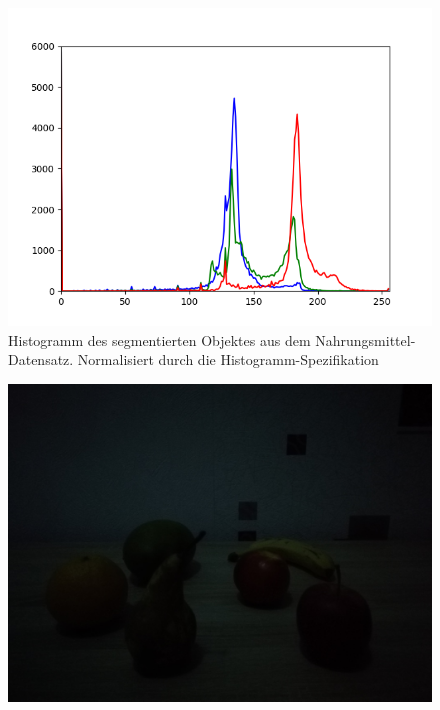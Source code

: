 \begin{appendices}
\begin{figure}[htb]
\begin{minipage}[c]{0.08\textwidth}
\end{minipage}
\hfill
\begin{minipage}[c]{0.3\textwidth}
\includegraphics[width=\textwidth]{Sources/Bild3_HS_histo.png}
\end{minipage}
\caption{Histogramm des segmentierten Objektes aus dem Nahrungsmittel-Datensatz. Normalisiert durch die Histogramm-Spezifikation}
\label{img:evalHS}
\end{figure}
\begin{figure}[htbp]
\center
\begin{minipage}{0.49\textwidth}
\includegraphics[width=.8\textwidth]{Sources/Anhang/resize_0250.jpg}
\end{minipage}
\begin{minipage}{0.49\textwidth}

\end{minipage}
\end{figure}
\end{appendices}
